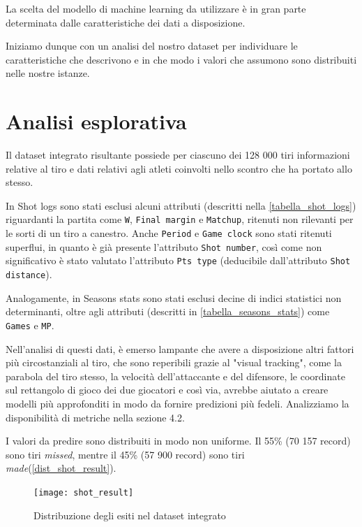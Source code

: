 La scelta del modello di machine learning da utilizzare è in gran parte determinata dalle caratteristiche dei dati a disposizione.

Iniziamo dunque con un analisi del nostro dataset per individuare le caratteristiche che descrivono e in che modo i valori che assumono sono distribuiti nelle nostre istanze.

\section{Analisi esplorativa}

\par
Il dataset integrato risultante possiede per ciascuno dei 128 000 tiri informazioni relative al tiro e dati relativi agli atleti coinvolti nello scontro che ha portato allo stesso.
\par

In Shot logs sono stati esclusi alcuni attributi (descritti nella \autoref{tabella_shot_logs}) riguardanti la partita come \texttt{W}, \texttt{Final margin} e \texttt{Matchup}, ritenuti non rilevanti per le sorti di un tiro a canestro.
Anche \texttt{Period} e \texttt{Game clock} sono stati ritenuti superflui, in quanto è già presente l'attributo \texttt{Shot number}, così come non significativo è stato valutato l'attributo \texttt{Pts type} (deducibile dall'attributo \texttt{Shot distance}). 
\par
Analogamente, in Seasons stats sono stati esclusi decine di indici statistici non determinanti, oltre agli attributi (descritti in \autoref{tabella_seasons_stats}) come \texttt{Games} e \texttt{MP}.

\par
Nell'analisi di questi dati, è emerso lampante che avere a disposizione altri fattori più circostanziali al tiro, che sono reperibili grazie al "visual tracking", come la parabola del tiro stesso, la velocità dell'attaccante e del difensore, le coordinate sul rettangolo di gioco dei due giocatori e così via, avrebbe aiutato a creare modelli più approfonditi in modo da fornire predizioni più fedeli.
Analizziamo la disponibilità di metriche nella sezione 4.2.

\par
I valori da predire sono distribuiti in modo non uniforme. Il 55\% (70 157 record) sono tiri \textit{missed}, mentre il 45\% (57 900 record) sono tiri \textit{made}(\autoref{dist_shot_result}).

\begin{figure}
\caption{Distribuzione degli esiti nel dataset integrato}
\label{dist_shot_result}
	\texttt{[image: shot\_result]}
\end{figure}

